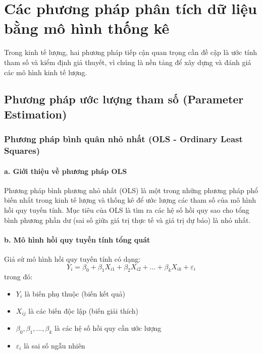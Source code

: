 \chapter{Các phương pháp phân tích dữ liệu bằng mô hình thống kê}
Trong kinh tế lượng, hai phương pháp tiếp cận quan trọng cần đề cập là ước tính tham số và kiểm định giả thuyết, vì chúng là nền tảng để xây dựng và đánh giá các mô hình kinh tế lượng.
\section{Phương pháp ước lượng tham số (Parameter Estimation)}
\subsection{Phương pháp bình quân nhỏ nhất (OLS - Ordinary Least Squares)}
\subsubsection{a. Giới thiệu về phương pháp OLS}
Phương pháp bình phương nhỏ nhất (OLS) là một trong những phương pháp phổ biến nhất trong kinh tế lượng và thống kê để ước lượng các tham số của mô hình hồi quy tuyến tính. Mục tiêu của OLS là tìm ra các hệ số hồi quy sao cho tổng bình phương phần dư (sai số giữa giá trị thực tế và giá trị dự báo) là nhỏ nhất.

\subsubsection{b. Mô hình hồi quy tuyến tính tổng quát}
Giả sử mô hình hồi quy tuyến tính có dạng:
\begin{equation}
Y_i = \beta_0 + \beta_1 X_{i1} + \beta_2 X_{i2} + \dots + \beta_k X_{ik} + \varepsilon_i
\end{equation}
trong đó:
\begin{itemize}
    \item $Y_i$ là biến phụ thuộc (biến kết quả)
    \item $X_{ij}$ là các biến độc lập (biến giải thích)
    \item $\beta_0, \beta_1, \dots, \beta_k$ là các hệ số hồi quy cần ước lượng
    \item $\varepsilon_i$ là sai số ngẫu nhiên
\end{itemize}

